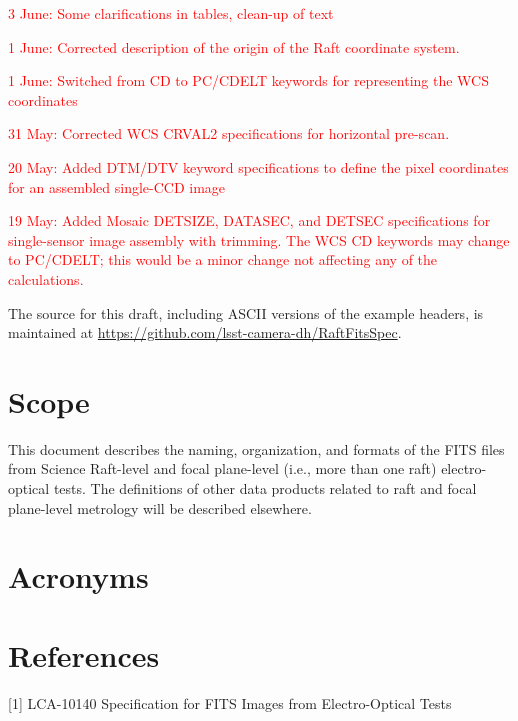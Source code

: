 \documentclass{article}[12pt]
\newcommand{\red}{\textcolor{red}}
\begin{document}
\red{3 June:  Some clarifications in tables, clean-up of text}

\red{1 June:  Corrected description of the origin of the Raft coordinate system.}

\red{1 June:  Switched from CD to PC/CDELT keywords for representing the WCS coordinates} 

\red{31 May:  Corrected WCS CRVAL2 specifications for horizontal pre-scan.}

\red{20 May:  Added DTM/DTV keyword specifications to define the pixel coordinates for an assembled single-CCD image}

\red{19 May:  Added Mosaic DETSIZE, DATASEC, and DETSEC specifications for single-sensor image assembly with trimming.  The WCS CD keywords may change to PC/CDELT; this would be a minor change not affecting any of the calculations.}

The source for this draft, including ASCII versions of the example headers, is maintained at \url{https://github.com/lsst-camera-dh/RaftFitsSpec}.

\section{Scope}
This document describes the naming, organization, and formats of the FITS files from Science Raft-level and focal plane-level (i.e., more than one raft) electro-optical tests.  The definitions of other data products related to raft and focal plane-level metrology will be described elsewhere.

\section{Acronyms}

\section{References}

[1] LCA-10140 Specification for FITS Images from Electro-Optical Tests




\end{document}
